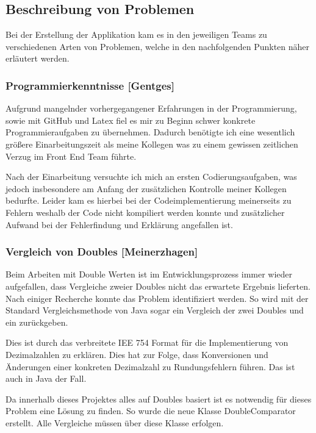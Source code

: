 {\clearpage

\subsection{Beschreibung von Problemen}

Bei der Erstellung der Applikation kam es in den jeweiligen Teams zu verschiedenen Arten von Problemen, welche in den nachfolgenden Punkten näher erläutert werden.

\subsubsection{Programmierkenntnisse [Gentges]}

Aufgrund mangelnder vorhergegangener Erfahrungen in der Programmierung, sowie mit GitHub und Latex fiel es mir zu Beginn schwer konkrete Programmieraufgaben zu übernehmen. Dadurch benötigte ich eine wesentlich größere Einarbeitungszeit als meine Kollegen was zu einem gewissen zeitlichen Verzug im Front End Team führte.

Nach der Einarbeitung versuchte ich mich an ersten Codierungsaufgaben, was jedoch insbesondere am Anfang der zusätzlichen Kontrolle meiner Kollegen bedurfte. 
Leider kam es hierbei bei der Codeimplementierung meinerseits zu Fehlern weshalb der Code nicht kompiliert werden konnte und zusätzlicher Aufwand bei der Fehlerfindung und Erklärung angefallen ist. 

\subsubsection{Vergleich von Doubles [Meinerzhagen]}
Beim Arbeiten mit Double Werten ist im Entwicklungsprozess immer wieder aufgefallen, dass Vergleiche zweier Doubles nicht das erwartete Ergebnis lieferten. Nach einiger Recherche konnte das Problem identifiziert werden. So wird mit der Standard Vergleichsmethode von Java sogar ein  Vergleich der zwei Doubles  und  ein  zurückgeben.

Dies ist durch das verbreitete IEE 754 Format für die Implementierung von Dezimalzahlen zu erklären. Dies hat zur Folge, dass Konversionen und Änderungen einer konkreten Dezimalzahl zu Rundungsfehlern führen. Das ist auch in Java der Fall.

Da innerhalb dieses Projektes alles auf Doubles basiert ist es notwendig für dieses Problem eine Lösung zu finden. So wurde die neue Klasse DoubleComparator erstellt. Alle Vergleiche müssen über diese Klasse erfolgen.

}
